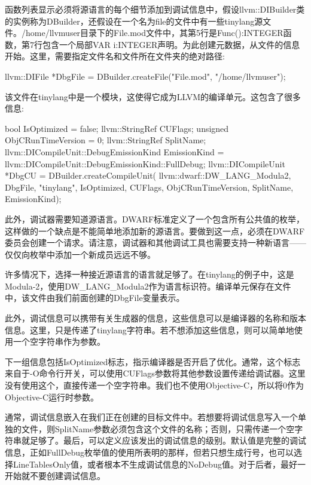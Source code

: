 函数列表显示必须将源语言的每个细节添加到调试信息中，假设llvm::DIBuilder类的实例称为DBuilder，还假设在一个名为file的文件中有一些tinylang源文件。/home/llvmuser目录下的File.mod文件中，其第5行是Func():INTEGER函数，第7行包含一个局部VAR i:INTEGER声明。为此创建元数据，从文件的信息开始。这里，需要指定文件名和文件所在文件夹的绝对路径:

\begin{cpp}
llvm::DIFile *DbgFile = DBuilder.createFile("File.mod",
                                            "/home/llvmuser");
\end{cpp}

该文件在tinylang中是一个模块，这使得它成为LLVM的编译单元。这包含了很多信息:

\begin{cpp}
bool IsOptimized = false;
llvm::StringRef CUFlags;
unsigned ObjCRunTimeVersion = 0;
llvm::StringRef SplitName;
llvm::DICompileUnit::DebugEmissionKind EmissionKind =
    llvm::DICompileUnit::DebugEmissionKind::FullDebug;
llvm::DICompileUnit *DbgCU = DBuilder.createCompileUnit(
    llvm::dwarf::DW_LANG_Modula2, DbgFile, "tinylang",
    IsOptimized, CUFlags, ObjCRunTimeVersion, SplitName,
    EmissionKind);
\end{cpp}

此外，调试器需要知道源语言。DWARF标准定义了一个包含所有公共值的枚举，这样做的一个缺点是不能简单地添加新的源语言。要做到这一点，必须在DWARF委员会创建一个请求。请注意，调试器和其他调试工具也需要支持一种新语言——仅仅向枚举中添加一个新成员远远不够。

许多情况下，选择一种接近源语言的语言就足够了。在tinylang的例子中，这是Modula-2，使用DW\_LANG\_Modula2作为语言标识符。编译单元保存在文件中，该文件由我们前面创建的DbgFile变量表示。

此外，调试信息可以携带有关生成器的信息，这些信息可以是编译器的名称和版本信息。这里，只是传递了tinylang字符串。若不想添加这些信息，则可以简单地使用一个空字符串作为参数。

下一组信息包括IsOptimized标志，指示编译器是否开启了优化。通常，这个标志来自于-O命令行开关，可以使用CUFlags参数将其他参数设置传递给调试器。这里没有使用这个，直接传递一个空字符串。我们也不使用Objective-C，所以将0作为Objective-C运行时参数。

通常，调试信息嵌入在我们正在创建的目标文件中。若想要将调试信息写入一个单独的文件，则SplitName参数必须包含这个文件的名称；否则，只需传递一个空字符串就足够了。最后，可以定义应该发出的调试信息的级别。默认值是完整的调试信息，正如FullDebug枚举值的使用所表明的那样，但若只想生成行号，也可以选择LineTablesOnly值，或者根本不生成调试信息的NoDebug值。对于后者，最好一开始就不要创建调试信息。


